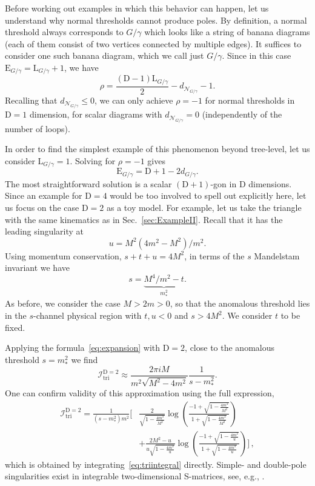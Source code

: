 \documentclass[12pt]{article}
\numberwithin{figure}{section}
\def \be {\begin{equation}}
\def \ee {\end{equation}}
\def \nn {\nonumber}
\def \D {\mathrm{D}}
\def \E {\mathrm{E}}
\def \L {\mathrm{L}}
\def \leq {\leqslant}
\def \I {\mathcal{I}}
\def \N {\mathcal{N}}
\def \triangle {\mathrm{tri}}
\def \upgamma {\rho}
\begin{document}
				Before working out examples in which this behavior can happen, let us understand why normal thresholds cannot produce poles. By definition, a normal threshold always corresponds to $G/\gamma$ which looks like a string of banana diagrams (each of them consist of two vertices connected by multiple edges). It suffices to consider one such banana diagram, which we call just $G/\gamma$.
				Since in this case $\E_{G/\gamma} = \L_{G/\gamma}{+}1$, we have
				\be
				\upgamma = \frac{(\D-1)\L_{G/\gamma}}{2} - d_{\N_{G/\gamma}} -1.
				\ee
				Recalling that $d_{\N_{G/\gamma}} \leq 0$, we can only achieve $\upgamma = -1$ for normal thresholds in $\D=1$ dimension, for scalar diagrams with $d_{\N_{G/\gamma}}=0$ (independently of the number of loops).
				
				In order to find the simplest example of this phenomenon beyond tree-level, let us consider $\L_{G/\gamma}=1$. Solving for $\upgamma = -1$ gives
				\be
				\E_{G/\gamma} = \D + 1 - 2d_{G/\gamma}.
				\ee
				The most straightforward solution is a scalar $(\D{+}1)$-gon in $\D$ dimensions. Since an example for $\D=4$ would be too involved to spell out explicitly here, let us focus on the case $\D=2$ as a toy model. For example, let us take the triangle with the same kinematics as in Sec.~\ref{sec:ExampleII}. Recall that it has the leading singularity at
				\be
				u = M^2 (4m^2 - M^2)/m^2.
				\ee
				Using momentum conservation, $s+t+u = 4M^2$, in terms of the $s$ Mandelstam invariant we have
				\be
				s = \underbrace{M^4/m^2 - t}_{m_\ast^2}.
				\ee
				As before, we consider the case $M > 2m > 0$, so that the anomalous threshold lies in the $s$-channel physical region with $t,u<0$ and $s>4M^2$. We consider $t$ to be fixed.
				
				Applying the formula~\eqref{eq:expansion} with $\D=2$, close to the anomalous threshold $s = m_\ast^2$ we find
				\be
				\I_{\triangle}^{\D=2} \approx \frac{ 
				2\pi i M}{m^2\sqrt{M^2 - 4m^2}} \frac{1}{s - m_\ast^2}.
				\ee
				One can confirm validity of this approximation using the full expression,
				\begin{align}
					\I_{\triangle}^{\D=2} = \frac{1}{(s-m_\ast^2) m^2} \bigg[& \frac{2}{\sqrt{1 - \frac{4m^2}{M^2}}} \log\left( \frac{-1+\sqrt{1 - \frac{4m^2}{M^2}}}{1+\sqrt{1 - \frac{4m^2}{M^2}}}\right) \\
					& + \frac{2M^2-u}{u \sqrt{1-\frac{4 m^2}{u}}} \log\left( \frac{-1+\sqrt{1 - \frac{4m^2}{u}}}{1+\sqrt{1 - \frac{4m^2}{u}}} \right)
					\bigg] \,,\nn
				\end{align}
				which is obtained by integrating~\eqref{eq:triintegral} directly.
				Simple- and double-pole singularities exist in integrable two-dimensional S-matrices, see, e.g., \cite{Coleman:1978kk,Mattsson:2001ts}.
				
\end{document}
